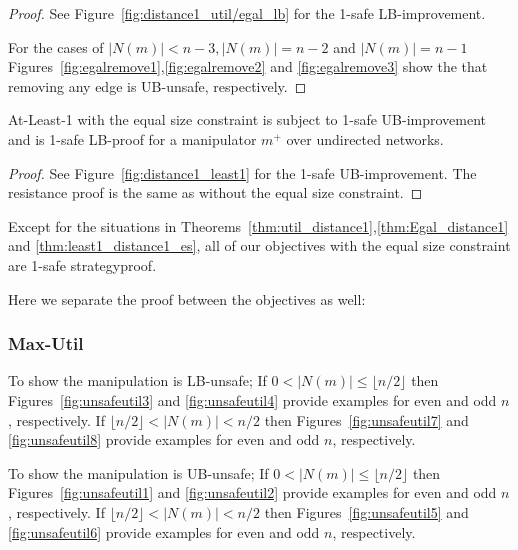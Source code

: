 \begin{proof}
See Figure~\ref{fig:distance1_util/egal_lb} for the 1-safe LB-improvement.

For the cases of $|N(m)|<n-3, |N(m)|=n-2$ and $|N(m)|=n-1$ Figures~\ref{fig:egalremove1},\ref{fig:egalremove2} and \ref{fig:egalremove3} show the that removing any edge is UB-unsafe, respectively.
\end{proof}

\begin{proposition}
\label{thm:least1_distance1_es}
At-Least-1 with the equal size constraint is subject to 1-safe UB-improvement and is 1-safe LB-proof for a manipulator $m^+$ over undirected networks.
\end{proposition}

\begin{proof}
See Figure~\ref{fig:distance1_least1} for the 1-safe UB-improvement.
The resistance proof is the same as without the equal size constraint.
\end{proof}


\begin{theorem}
\label{thm:all_distance1_es}
Except for the situations in Theorems~\ref{thm:util_distance1},\ref{thm:Egal_distance1} and \ref{thm:least1_distance1_es}, all of our objectives with the equal size constraint are 1-safe strategyproof. 
\end{theorem}
Here we separate the proof between the objectives as well:
\subsubsection*{Max-Util}
To show the manipulation is LB-unsafe;
If $0<|N(m)|\leq \lfloor n/2 \rfloor$ then Figures~\ref{fig:unsafeutil3} and \ref{fig:unsafeutil4} provide examples for even and odd $n$, respectively.
If $\lfloor n/2 \rfloor<|N(m)| < n/2$ then Figures~\ref{fig:unsafeutil7} and \ref{fig:unsafeutil8} provide examples for even and odd $n$, respectively.

To show the manipulation is UB-unsafe;
If $0<|N(m)|\leq \lfloor n/2 \rfloor$ then Figures~\ref{fig:unsafeutil1} and \ref{fig:unsafeutil2} provide examples for even and odd $n$, respectively.
If $\lfloor n/2 \rfloor<|N(m)| < n/2$ then Figures~\ref{fig:unsafeutil5} and \ref{fig:unsafeutil6} provide examples for even and odd $n$, respectively.


